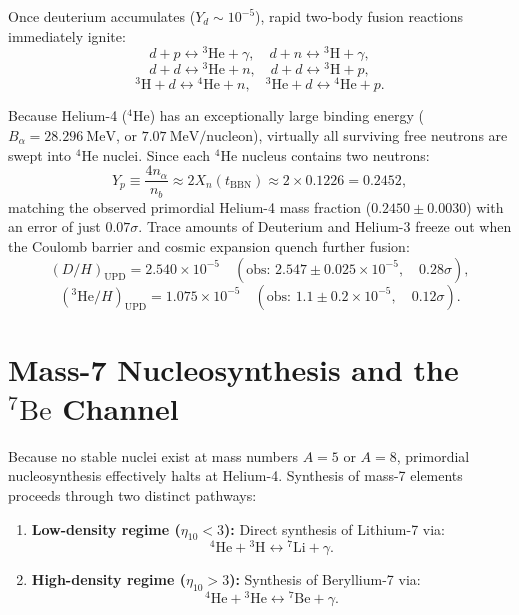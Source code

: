 \documentclass[11pt, a4paper]{article}
\theoremstyle{definition}
\theoremstyle{remark}
\begin{document}
Once deuterium accumulates ($Y_d \sim 10^{-5}$), rapid two-body fusion reactions immediately ignite:
\begin{equation}
  d + p \longleftrightarrow {}^3\mathrm{He} + \gamma, \quad d + n \longleftrightarrow {}^3\mathrm{H} + \gamma,
\end{equation}
\begin{equation}
  d + d \longleftrightarrow {}^3\mathrm{He} + n, \quad d + d \longleftrightarrow {}^3\mathrm{H} + p,
\end{equation}
\begin{equation}
  {}^3\mathrm{H} + d \longleftrightarrow {}^4\mathrm{He} + n, \quad {}^3\mathrm{He} + d \longleftrightarrow {}^4\mathrm{He} + p.
\end{equation}

Because Helium-4 ($^4\mathrm{He}$) has an exceptionally large binding energy ($B_\alpha = 28.296~\mathrm{MeV}$, or $7.07~\mathrm{MeV}/\mathrm{nucleon}$), virtually all surviving free neutrons are swept into $^4\mathrm{He}$ nuclei. Since each $^4\mathrm{He}$ nucleus contains two neutrons:
\begin{equation}
  Y_p \equiv \frac{4 n_\alpha}{n_b} \approx 2 X_n(t_{\mathrm{BBN}}) \approx 2 \times 0.1226 = 0.2452,
\end{equation}
matching the observed primordial Helium-4 mass fraction ($0.2450 \pm 0.0030$) with an error of just $0.07\sigma$. Trace amounts of Deuterium and Helium-3 freeze out when the Coulomb barrier and cosmic expansion quench further fusion:
\begin{equation}
  (D/H)_{\mathrm{UPD}} = 2.540 \times 10^{-5} \quad (\text{obs: } 2.547 \pm 0.025 \times 10^{-5}, \quad 0.28\sigma),
\end{equation}
\begin{equation}
  ({}^3\mathrm{He}/H)_{\mathrm{UPD}} = 1.075 \times 10^{-5} \quad (\text{obs: } 1.1 \pm 0.2 \times 10^{-5}, \quad 0.12\sigma).
\end{equation}

\section{Mass-7 Nucleosynthesis and the $^7\mathrm{Be}$ Channel}

Because no stable nuclei exist at mass numbers $A=5$ or $A=8$, primordial nucleosynthesis effectively halts at Helium-4. Synthesis of mass-7 elements proceeds through two distinct pathways:
\begin{enumerate}
  \item \textbf{Low-density regime ($\eta_{10} < 3$):} Direct synthesis of Lithium-7 via:
    \begin{equation}
      {}^4\mathrm{He} + {}^3\mathrm{H} \longleftrightarrow {}^7\mathrm{Li} + \gamma.
    \end{equation}
  \item \textbf{High-density regime ($\eta_{10} > 3$):} Synthesis of Beryllium-7 via:
    \begin{equation}
      {}^4\mathrm{He} + {}^3\mathrm{He} \longleftrightarrow {}^7\mathrm{Be} + \gamma.
    \end{equation}
\end{enumerate}
\end{document}
